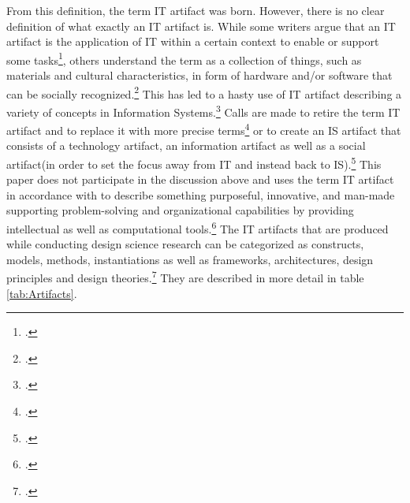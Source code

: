 From this definition, the term IT artifact was born. However, there is no clear definition of what exactly an IT artifact is. While some writers argue that an IT artifact is the application of IT within a certain context to enable or support some tasks\footcites[Cf.][p.186]{BenbasatEmpiricalresearchinformation1999}[cf.][p.50]{AlterconceptITartifact2015}, others understand the term as a collection of things, such as materials and cultural characteristics, in form of hardware and/or software that can be socially recognized.\footcite[Cf.][p.121]{OrlikowskiResearchCommentaryDesperately2001} This has led to a hasty use of IT artifact describing a variety of concepts in Information Systems.\footcite[Cf.][p.49]{AlterconceptITartifact2015} Calls are made to retire the term IT artifact and to replace it with more precise terms\footcite[Cf.][p.59]{AlterconceptITartifact2015} or to create an IS artifact that consists of a technology artifact, an information artifact as well as a social artifact(in order to set the focus away from IT and instead back to IS).\footcite[Cf.][pp.1,6]{LeeGoingbackbasics2015} This paper does not participate in the discussion above and uses the term IT artifact in accordance with \cite{HevnerDesignScienceResearch2004} to describe something purposeful, innovative, and man-made supporting problem-solving and organizational capabilities by providing intellectual as well as computational tools.\footcites[Cf.][pp.76,82]{HevnerDesignScienceResearch2004}[cf.][p.340]{GregorPositioningpresentingdesign2013}
The IT artifacts that are produced while conducting design science research can be categorized as constructs, models, methods, instantiations as well as frameworks, architectures, design principles and design theories.\footcites[Cf.][pp.256-258]{MarchDesignnaturalscience1995}[cf.][p.343]{GregorPositioningpresentingdesign2013} [cf.][p.50]{PuraoDesignResearchTechnology2002} [cf.][p.77]{HevnerDesignResearchInformation2010} They are described in more detail in table \ref{tab:Artifacts}. 

